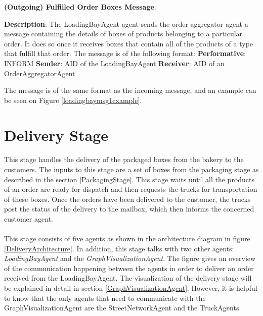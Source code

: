 \documentclass[11pt, a4paper]{article}
\begin{document}
\hfill\break
\textbf{(Outgoing) Fulfilled Order Boxes Message}:
	
\hfill\break
\textbf{Description}:
The LoadingBayAgent agent sends the order aggregator agent a message containing the details of boxes of products belonging to a particular order. It does so once it receives boxes that contain all of the products of a type that fulfill that order. The message is of the following format:
\hfill\break
\textbf{Performative}: INFORM
\hfill\break
\textbf{Sender}: AID of the LoadingBayAgent
\hfill\break
\textbf{Receiver}: AID of an OrderAggregatorAgent

\hfill\break	
The message is of the same format as the incoming message, and an example can be seen on Figure \ref{loadingbaymsg1example}.

\newpage
\section{Delivery Stage}\label{DeliveryStage}
\paragraph{}
This stage handles the delivery of the packaged boxes from the bakery to the customers. The inputs to this stage are a set of boxes from the packaging stage as described in the section \ref{PackagingStage}. This stage waits until all the products of an order are ready for dispatch and then requests the trucks for transportation of these boxes. Once the orders have been delivered to the customer, the trucks post the status of the delivery to the mailbox, which then informs the concerned customer agent.

\paragraph{}
This stage consists of five agents as shown in the architecture diagram in figure \ref{DeliveryArchitecture}. In addition, this stage talks with two other agents: \textit{LoadingBayAgent} and the \textit{GraphVisualizationAgent}. The figure gives an overview of the communication happening between the agents in order to deliver an order received from the LoadingBayAgent. The visualization of the delivery stage will be explained in detail in section \ref{GraphVisualizationAgent}. However, it is helpful to know that the only agents that need to communicate with the GraphVisualizationAgent are the StreetNetworkAgent and the TruckAgents. 
\end{document}
